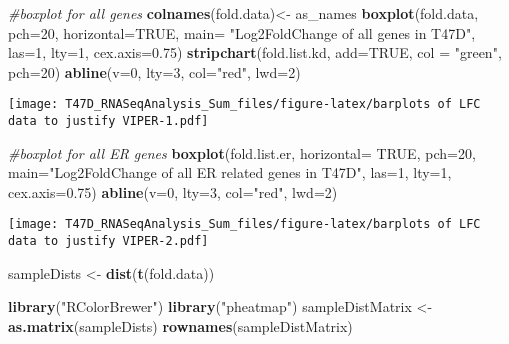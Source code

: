 \documentclass[]{article}
\newenvironment{Shaded}{\begin{snugshade}}{\end{snugshade}}
\newcommand{\KeywordTok}[1]{\textcolor[rgb]{0.13,0.29,0.53}{\textbf{#1}}}
\newcommand{\DataTypeTok}[1]{\textcolor[rgb]{0.13,0.29,0.53}{#1}}
\newcommand{\DecValTok}[1]{\textcolor[rgb]{0.00,0.00,0.81}{#1}}
\newcommand{\FloatTok}[1]{\textcolor[rgb]{0.00,0.00,0.81}{#1}}
\newcommand{\StringTok}[1]{\textcolor[rgb]{0.31,0.60,0.02}{#1}}
\newcommand{\CommentTok}[1]{\textcolor[rgb]{0.56,0.35,0.01}{\textit{#1}}}
\newcommand{\OtherTok}[1]{\textcolor[rgb]{0.56,0.35,0.01}{#1}}
\newcommand{\NormalTok}[1]{#1}
\begin{document}
\begin{Shaded}
\begin{Highlighting}[]
\CommentTok{#boxplot for all genes}
\KeywordTok{colnames}\NormalTok{(fold.data)<-}\StringTok{ }\NormalTok{as_names}
\KeywordTok{boxplot}\NormalTok{(fold.data, }\DataTypeTok{pch=}\DecValTok{20}\NormalTok{, }\DataTypeTok{horizontal=}\OtherTok{TRUE}\NormalTok{, }\DataTypeTok{main=} \StringTok{"Log2FoldChange of all genes in T47D"}\NormalTok{, }\DataTypeTok{las=}\DecValTok{1}\NormalTok{, }\DataTypeTok{lty=}\DecValTok{1}\NormalTok{, }\DataTypeTok{cex.axis=}\FloatTok{0.75}\NormalTok{)}
\KeywordTok{stripchart}\NormalTok{(fold.list.kd, }\DataTypeTok{add=}\OtherTok{TRUE}\NormalTok{, }\DataTypeTok{col =} \StringTok{"green"}\NormalTok{, }\DataTypeTok{pch=}\DecValTok{20}\NormalTok{)}
\KeywordTok{abline}\NormalTok{(}\DataTypeTok{v=}\DecValTok{0}\NormalTok{, }\DataTypeTok{lty=}\DecValTok{3}\NormalTok{, }\DataTypeTok{col=}\StringTok{"red"}\NormalTok{, }\DataTypeTok{lwd=}\DecValTok{2}\NormalTok{)}
\end{Highlighting}
\end{Shaded}

\texttt{[image: T47D\_RNASeqAnalysis\_Sum\_files/figure-latex/barplots of LFC data to justify VIPER-1.pdf]}

\begin{Shaded}
\begin{Highlighting}[]
\CommentTok{#boxplot for all ER genes}
\KeywordTok{boxplot}\NormalTok{(fold.list.er, }\DataTypeTok{horizontal=} \OtherTok{TRUE}\NormalTok{, }\DataTypeTok{pch=}\DecValTok{20}\NormalTok{, }\DataTypeTok{main=}\StringTok{"Log2FoldChange of all ER related genes in T47D"}\NormalTok{, }\DataTypeTok{las=}\DecValTok{1}\NormalTok{, }\DataTypeTok{lty=}\DecValTok{1}\NormalTok{, }\DataTypeTok{cex.axis=}\FloatTok{0.75}\NormalTok{)}
\KeywordTok{abline}\NormalTok{(}\DataTypeTok{v=}\DecValTok{0}\NormalTok{, }\DataTypeTok{lty=}\DecValTok{3}\NormalTok{, }\DataTypeTok{col=}\StringTok{"red"}\NormalTok{, }\DataTypeTok{lwd=}\DecValTok{2}\NormalTok{)}
\end{Highlighting}
\end{Shaded}

\texttt{[image: T47D\_RNASeqAnalysis\_Sum\_files/figure-latex/barplots of LFC data to justify VIPER-2.pdf]}

\begin{Shaded}
\begin{Highlighting}[]
\NormalTok{sampleDists <-}\StringTok{ }\KeywordTok{dist}\NormalTok{(}\KeywordTok{t}\NormalTok{(fold.data))}

\KeywordTok{library}\NormalTok{(}\StringTok{"RColorBrewer"}\NormalTok{)}
\KeywordTok{library}\NormalTok{(}\StringTok{"pheatmap"}\NormalTok{)}
\NormalTok{sampleDistMatrix <-}\StringTok{ }\KeywordTok{as.matrix}\NormalTok{(sampleDists)}
\KeywordTok{rownames}\NormalTok{(sampleDistMatrix) }
\end{Highlighting}
\end{Shaded}
\end{document}
